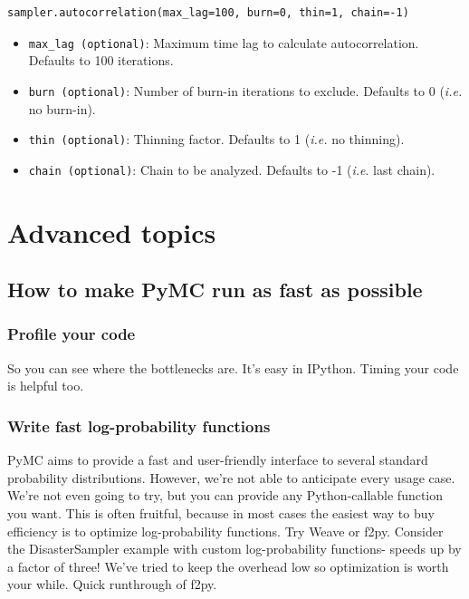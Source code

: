 \documentclass[]{book}
\begin{document}
\begin{verbatim}
sampler.autocorrelation(max_lag=100, burn=0, thin=1, chain=-1)
\end{verbatim}

\begin{itemize}

\item \verb=max_lag (optional)=: Maximum time lag to calculate autocorrelation. Defaults to 100 iterations.

\item \verb=burn (optional)=: Number of burn-in iterations to exclude. Defaults to 0 (\emph{i.e.} no burn-in).

\item \verb=thin (optional)=: Thinning factor. Defaults to 1 (\emph{i.e.} no thinning).

\item \verb=chain (optional)=: Chain to be analyzed. Defaults to -1 (\emph{i.e}. last chain).
\end{itemize}


\chapter{Advanced topics}

\section{How to make PyMC run as fast as possible}\label{sec:fast} %
\subsection{Profile your code}\label{sub:profile_your_code} %
So you can see where the bottlenecks are. It's easy in IPython. Timing your code is helpful too.

\subsection{Write fast log-probability functions}\label{sub:write_fast_log_probability_functions} %

PyMC aims to provide a fast and user-friendly interface to several standard probability distributions. However, we're not able to anticipate every usage case. We're not even going to try, but you can provide any Python-callable function you want. This is often fruitful, because in most cases the easiest way to buy efficiency is to optimize log-probability functions. Try Weave or f2py. Consider the DisasterSampler example with custom log-probability functions- speeds up by a factor of three! We've tried to keep the overhead low so optimization is worth your while. Quick runthrough of f2py.
\end{document}
